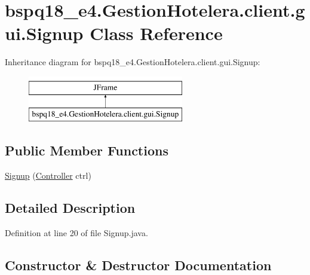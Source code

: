 \hypertarget{classbspq18__e4_1_1_gestion_hotelera_1_1client_1_1gui_1_1_signup}{}\section{bspq18\+\_\+e4.\+Gestion\+Hotelera.\+client.\+gui.\+Signup Class Reference}
\label{classbspq18__e4_1_1_gestion_hotelera_1_1client_1_1gui_1_1_signup}
Inheritance diagram for bspq18\+\_\+e4.\+Gestion\+Hotelera.\+client.\+gui.\+Signup\+:\begin{figure}[H]
\begin{center}
\leavevmode
\includegraphics[height=2.000000cm]{classbspq18__e4_1_1_gestion_hotelera_1_1client_1_1gui_1_1_signup}
\end{center}
\end{figure}
\subsection*{Public Member Functions}
\begin{DoxyCompactItemize}
\item 
\mbox{\hyperlink{classbspq18__e4_1_1_gestion_hotelera_1_1client_1_1gui_1_1_signup_a99f67ed951cff1edd106674a8ecac927}{Signup}} (\mbox{\hyperlink{classbspq18__e4_1_1_gestion_hotelera_1_1client_1_1controller_1_1_controller}{Controller}} ctrl)
\end{DoxyCompactItemize}


\subsection{Detailed Description}


Definition at line 20 of file Signup.\+java.



\subsection{Constructor \& Destructor Documentation}
\mbox{\label{classbspq18__e4_1_1_gestion_hotelera_1_1client_1_1gui_1_1_signup_a99f67ed951cff1edd106674a8ecac927}} 

